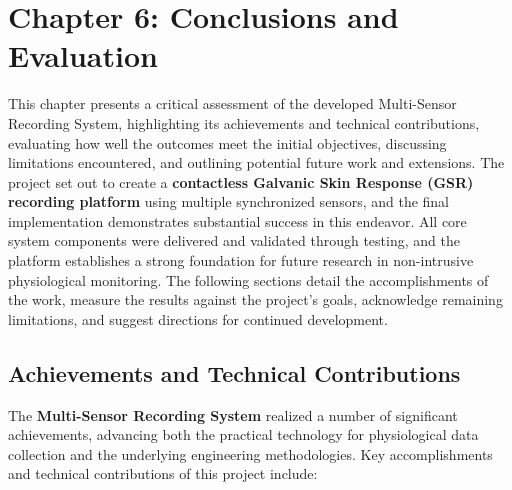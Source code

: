 \label{chap:6}

\chapter{Chapter 6: Conclusions and Evaluation}

This chapter presents a critical assessment of the developed
Multi-Sensor Recording System, highlighting its achievements and
technical contributions, evaluating how well the outcomes meet the
initial objectives, discussing limitations encountered, and outlining
potential future work and extensions. The project set out to create a
\textbf{contactless Galvanic Skin Response (GSR) recording platform} using
multiple synchronized sensors, and the final implementation demonstrates
substantial success in this endeavor. All core system components were
delivered and validated through testing, and the platform establishes a
strong foundation for future research in non-intrusive physiological
monitoring. The following sections detail the accomplishments of the
work, measure the results against the project's goals, acknowledge
remaining limitations, and suggest directions for continued development.

\section{Achievements and Technical Contributions}

The \textbf{Multi-Sensor Recording System} realized a number of significant
achievements, advancing both the practical technology for physiological
data collection and the underlying engineering methodologies. Key
accomplishments and technical contributions of this project include:

